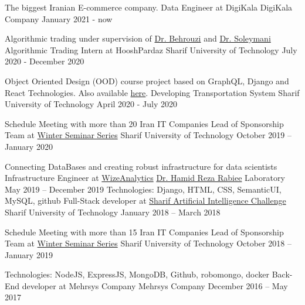 
\begin{cventries}
	\cventry
	{The biggest Iranian E-commerce company.}
	{Data Engineer at DigiKala}
	{DigiKala Company}
	{January 2021 - now}
	{}
	
  \cventry
  	{Algorithmic trading under supervision of \href{http://ee.sharif.edu/~behroozi}{Dr. Behrouzi} and \href{http://sharif.edu/~soleymani/}{Dr. Soleymani}}
  	{Algorithmic Trading Intern at HooshPardaz}
  	{Sharif University of Technology}
	{July 2020 - December 2020}
	{}
	
	\cventry
	{Object Oriented Design (OOD) course project based on GraphQL, Django and React Technologies. Also available \href{https://github.com/mostafaghadimi/OOD_Project}{here}.}
	{Developing Transportation System}
	{Sharif University of Technology}
	{April 2020 - July 2020}
	{}

  \cventry
	{Schedule Meeting with more than 20 Iran IT Companies}
	{Lead of Sponsorship Team at \href{https://wss.ce.sharif.edu/2019/staff/}{Winter Seminar Series}}
	{Sharif University of Technology}
	{October 2019 – January 2020}
	{}
	
  \cventry
	{Connecting DataBases and creating robust infrastructure for data scientists}
	{Infrastructure Engineer at \href{http://wizeanalytics.com/}{WizeAnalytics}}
	{\href{http://sharif.edu/~rabiee/}{Dr. Hamid Reza Rabiee} Laboratory}
	{May 2019 – December 2019}
	{}
  \cventry
    {Technologies: Django, HTML, CSS, SemanticUI, MySQL, github}
    {Full-Stack developer at \href{https://aichallenge.sharif.edu/}{Sharif Artificial Intelligence Challenge}}
    {Sharif University of Technology}
    {January 2018 – March 2018}
    {}
    
      \cventry
    {Schedule Meeting with more than 15 Iran IT Companies}
    {Lead of Sponsorship Team at \href{https://wss.ce.sharif.edu/2018/staff/}{Winter Seminar Series}}
    {Sharif University of Technology}
    {October 2018 – January 2019}
    {}
    
  \cventry
    {Technologies: NodeJS, ExpressJS, MongoDB, Github, robomongo, docker}
    {Back-End developer at Mehrsys Company}
    {Mehrsys Company}
    {December 2016 – May 2017}
    {}
    
  
\end{cventries}

